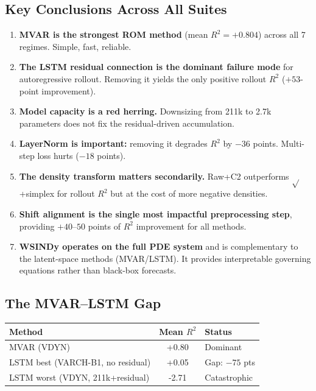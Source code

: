 \documentclass[11pt]{article}
\newcommand{\Rtwo}{R^2}
\begin{document}
\subsection{Key Conclusions Across All Suites}

\begin{enumerate}
  \item \textbf{MVAR is the strongest ROM method} (mean $\Rtwo = +0.804$)
    across all 7 regimes.  Simple, fast, reliable.

  \item \textbf{The LSTM residual connection is the dominant failure mode}
    for autoregressive rollout.  Removing it yields the only positive
    rollout $\Rtwo$ ($+53$-point improvement).

  \item \textbf{Model capacity is a red herring.}  Downsizing from 211k
    to 2.7k parameters does not fix the residual-driven accumulation.

  \item \textbf{LayerNorm is important:} removing it degrades $\Rtwo$ by
    $-36$ points.  Multi-step loss hurts ($-18$ points).

  \item \textbf{The density transform matters secondarily.}  Raw+C2
    outperforms $\sqrt{}$+simplex for rollout $\Rtwo$ but at the cost
    of more negative densities.

  \item \textbf{Shift alignment is the single most impactful preprocessing
    step}, providing $+40$--$50$ points of $\Rtwo$ improvement for all methods.

  \item \textbf{WSINDy operates on the full PDE system} and is
    complementary to the latent-space methods (MVAR/LSTM).  It provides
    interpretable governing equations rather than black-box forecasts.
\end{enumerate}


\subsection{The MVAR--LSTM Gap}

\begin{center}
\begin{tabular}{lS[table-format=+1.2]l}
\toprule
Method & {Mean $\Rtwo$} & Status \\
\midrule
MVAR (VDYN) & +0.80 & Dominant \\
LSTM best (VARCH-B1, no residual) & +0.05 & Gap: $-75$ pts \\
LSTM worst (VDYN, 211k+residual) & -2.71 & Catastrophic \\
\bottomrule
\end{tabular}
\end{center}
\end{document}
